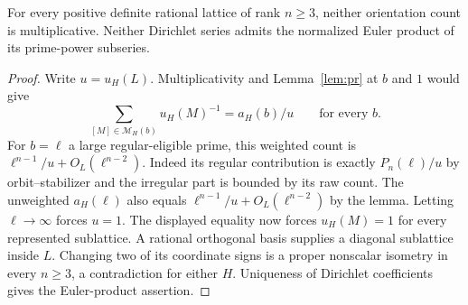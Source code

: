 \begin{theorem}\label{th:nonmult}
For every positive definite rational lattice of rank $n\ge3$, neither orientation count is multiplicative. Neither Dirichlet series admits the normalized Euler product of its prime-power subseries.
\end{theorem}
\begin{proof}
Write $u=u_H(L)$. Multiplicativity and Lemma~\ref{lem:pr} at $b$ and $1$ would give
\[
 \sum_{[M]\in\mathcal M_H(b)}u_H(M)^{-1}=a_H(b)/u\qquad\text{for every }b.
\]
For $b=\ell$ a large regular-eligible prime, this weighted count is $\ell^{n-1}/u+O_L(\ell^{n-2})$. Indeed its regular contribution is exactly $P_n(\ell)/u$ by orbit--stabilizer and the irregular part is bounded by its raw count. The unweighted $a_H(\ell)$ also equals $\ell^{n-1}/u+O_L(\ell^{n-2})$ by the lemma. Letting $\ell\to\infty$ forces $u=1$. The displayed equality now forces $u_H(M)=1$ for every represented sublattice. A rational orthogonal basis supplies a diagonal sublattice inside $L$. Changing two of its coordinate signs is a proper nonscalar isometry in every $n\ge3$, a contradiction for either $H$. Uniqueness of Dirichlet coefficients gives the Euler-product assertion.
\end{proof}

